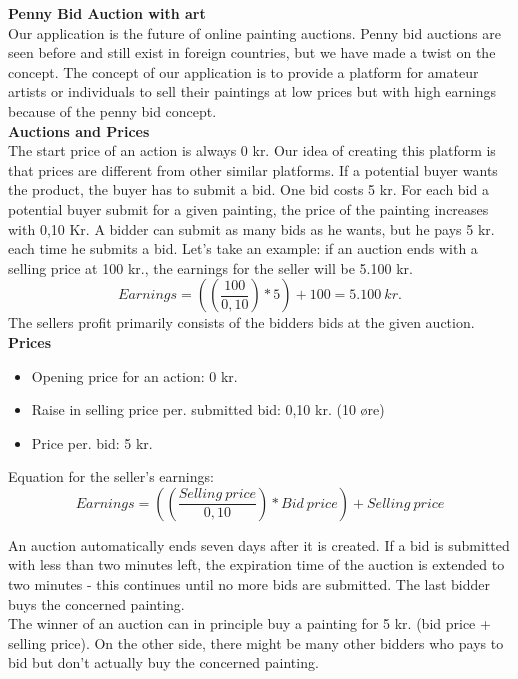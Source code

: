 
\textbf{Penny Bid Auction with art} \\
Our application is the future of online painting auctions. Penny bid auctions are seen before and still exist in foreign countries, but we have made a twist on the concept. The concept of our application is to provide a platform for amateur artists or individuals to sell their paintings at low prices but with high earnings because of the penny bid concept.\\  

\textbf{Auctions and Prices}\\
The start price of an action is always 0 kr. Our idea of creating this platform is that prices are different from other similar platforms. If a potential buyer wants the product, the buyer has to submit a bid. One bid costs 5 kr. For each bid a potential buyer submit for a given painting, the price of the painting increases with 0,10 Kr. A bidder can submit as many bids as he wants, but he pays 5 kr. each time he submits a bid. Let's take an example: if an auction ends with a selling price at 100 kr., the earnings for the seller will be 5.100 kr.
\begin{equation}
Earnings = ((\frac{100}{0,10}) * 5)+100=5.100\ kr.
\end{equation}
The sellers profit primarily consists of the bidders bids at the given auction.\\

\textbf{Prices}
\begin{itemize}
    \item Opening price for an action: 0 kr.
    \item Raise in selling price per. submitted bid: 0,10 kr. (10 øre)
    \item Price per. bid: 5 kr.
\end{itemize}

Equation for the seller's earnings: 
\begin{equation}\label{sellersEarnings}
    Earnings = ((\frac{Selling\ price}{0,10}) * Bid\ price)+Selling\ price
\end{equation}

An auction automatically ends seven days after it is created. If a bid is submitted with less than two minutes left, the expiration time of the auction is extended to two minutes - this continues until no more bids are submitted. The last bidder buys the concerned painting. \\

The winner of an auction can in principle buy a painting for 5 kr. (bid price + selling price). On the other side, there might be many other bidders who pays to bid but don't actually buy the concerned painting.\\

